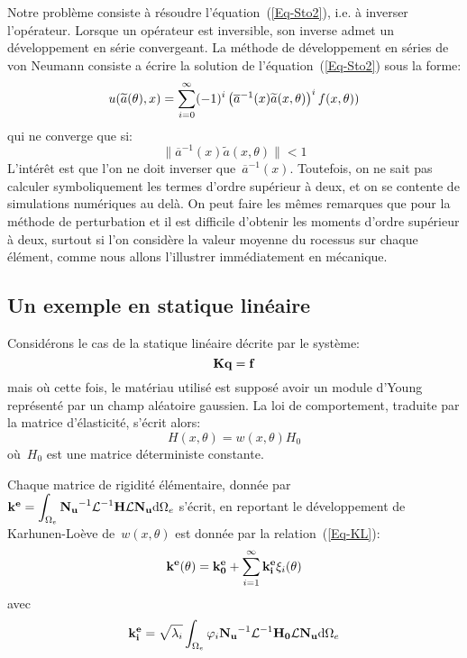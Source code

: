 Notre problème consiste à résoudre l'équation~(\ref{Eq-Sto2}), i.e. à inverser l'opérateur.
Lorsque un opérateur est inversible, son inverse admet un développement en série convergeant.
La méthode de développement en séries de von Neumann consiste a écrire la solution de l'équation~(\ref{Eq-Sto2}) sous la forme:
\begin{equation}\label{Eq-StoNeu}
u(\widetilde{a}(\theta),x)=\displaystyle\sum_{i=0}^\infty (-1)^i \begin{pmatrix}\overline{a}^{-1}(x)\widetilde{a}(x,\theta)\end{pmatrix}^i f(x,\theta))
\end{equation}
qui ne converge que si:
\begin{equation}
\|\overline{a}^{-1}(x)\widetilde{a}(x,\theta)\| <1
\end{equation}
L'intérêt est que l'on ne doit inverser que~$\overline{a}^{-1}(x)$.
Toutefois, on ne sait pas calculer symboliquement les termes d'ordre supérieur à deux, et on se contente de simulations numériques au delà.
On peut faire les mêmes remarques que pour la méthode de perturbation et il est difficile d'obtenir les moments d'ordre supérieur à deux, surtout si l'on considère la valeur moyenne du rocessus sur chaque élément, comme nous allons l'illustrer immédiatement en mécanique.

\medskip
\subsection{Un exemple en statique linéaire}

Considérons le cas de la statique linéaire décrite par le système:
$$ \MM{K}\VV{q}=\VV{f} $$
mais où cette fois, le matériau utilisé est supposé avoir un module d'Young représenté par un champ aléatoire gaussien.
La loi de comportement, traduite par la matrice d'élasticité, s'écrit alors:
\begin{equation}
H(x,\theta)=w(x,\theta)H_0
\end{equation}
où~$H_0$ est une matrice déterministe constante.

Chaque matrice de rigidité élémentaire, donnée par~$\MM{k^e}=\dint_{\Omega_e} \MMI{N_u}\MMI{\mathcal{L}}\MM{H}\MM{\mathcal{L}}\MM{N_u} \dd\Omega_e$ s'écrit, en reportant le développement de Karhunen-Loève de~$w(x,\theta)$ est donnée par la relation~(\ref{Eq-KL}):
\begin{equation}
\MM{k^e(\theta)}=\MM{k^e_0} +\dsum_{i=1}^\infty \MM{k_i^e}\xi_i(\theta)
\end{equation} 
avec
\begin{equation}
\MM{k_i^e}=\sqrt{\lambda_i}\dint_{\Omega_e} \varphi_i\MMI{N_u}\MMI{\mathcal{L}}\MM{H_0}\MM{\mathcal{L}}\MM{N_u} \dd\Omega_e
\end{equation}

